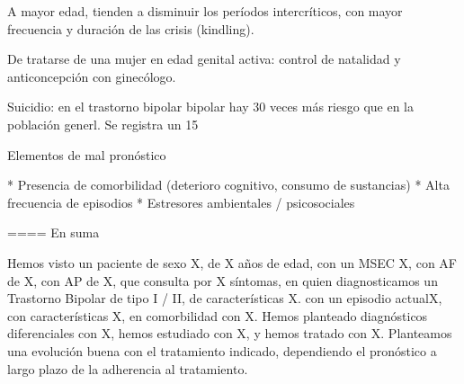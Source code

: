 \documentclass[encares.tex]{subfiles}
\begin{document}
A mayor edad, tienden a disminuir los períodos intercríticos, con mayor frecuencia y duración de las crisis (kindling).

De tratarse de una mujer en edad genital activa: control de natalidad y anticoncepción con ginecólogo.

Suicidio: en el trastorno bipolar bipolar hay 30 veces más riesgo que en la población generl. Se registra un 15 %

Elementos de mal pronóstico

* Presencia de comorbilidad (deterioro cognitivo, consumo de sustancias)
* Alta frecuencia de episodios
* Estresores ambientales / psicosociales

==== En suma

Hemos visto un paciente de sexo X, de X años de edad, con un MSEC X, con AF de X, con AP de X, que consulta por X síntomas, en quien diagnosticamos un Trastorno Bipolar de tipo I / II, de características X. con un episodio actualX, con características X, en comorbilidad con X. Hemos planteado diagnósticos diferenciales con X, hemos estudiado con X, y hemos tratado con X. Planteamos una evolución buena con el tratamiento indicado, dependiendo el pronóstico a largo plazo de la adherencia al tratamiento.
\end{document}
